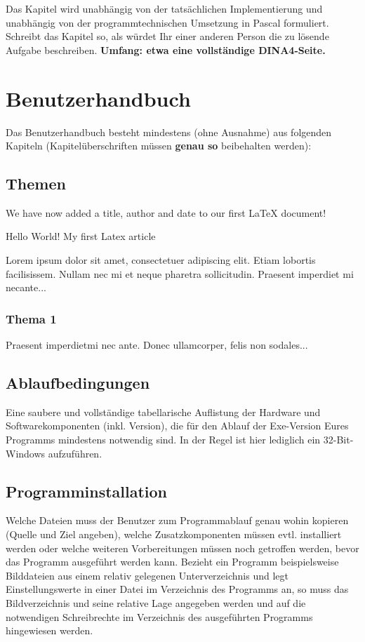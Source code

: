 \documentclass[12pt, letterpaper]{article}
\begin{document}
            Das Kapitel wird unabhängig von der tatsächlichen Implementierung und unabhängig von
            der programmtechnischen Umsetzung in Pascal formuliert. 
            Schreibt das Kapitel so, als würdet Ihr einer anderen Person die zu lösende Aufgabe beschreiben. 
            \textbf{Umfang: etwa eine vollständige DINA4-Seite.}
    \newpage

    \section{Benutzerhandbuch}
    Das Benutzerhandbuch besteht mindestens
    (ohne Ausnahme) aus folgenden Kapiteln
    (Kapitelüberschriften müssen \textbf{genau so} beibehalten werden): 
            
        \subsection{Themen}
            We have now added a title, author and date to our first \LaTeX{} document!

            Hello World!
            My first Latex article

            Lorem ipsum dolor sit amet, consectetuer adipiscing elit.  
            Etiam lobortis facilisissem.  Nullam nec mi et neque pharetra 
            sollicitudin.  Praesent imperdiet mi necante...

            \subsubsection{Thema 1}
            Praesent imperdietmi nec ante. Donec ullamcorper, felis non sodales...
    
        \subsection{Ablaufbedingungen}
            Eine saubere und vollständige tabellarische Auflistung der Hardware und Softwarekomponenten (inkl. Version),
            die für den Ablauf der Exe-Version Eures Programms mindestens notwendig sind.
            In der Regel ist hier lediglich ein 32-Bit-Windows aufzuführen.

        \subsection{Programminstallation}
            Welche Dateien muss der Benutzer zum Programmablauf genau wohin kopieren (Quelle und Ziel angeben), welche Zusatzkomponenten müssen evtl. installiert werden oder welche weiteren Vorbereitungen müssen noch getroffen werden, bevor das Programm ausgeführt werden kann. Bezieht ein Programm beispielsweise Bilddateien aus einem relativ gelegenen Unterverzeichnis und legt Einstellungswerte in einer Datei im Verzeichnis des Programms an, so muss das Bildverzeichnis und seine relative Lage angegeben werden und auf die notwendigen Schreibrechte im Verzeichnis des ausgeführten Programms hingewiesen werden.
        
\end{document}
